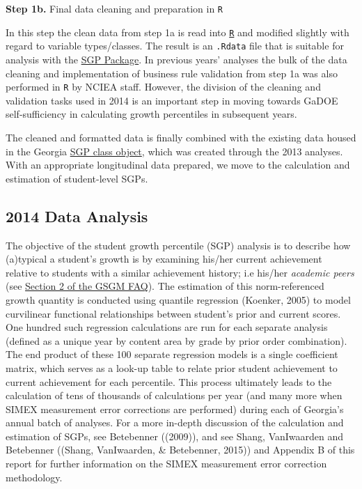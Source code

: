 \documentclass[12pt]{article}
\begin{document}
\textbf{Step 1b.} Final data cleaning and preparation in \texttt{R}

In this step the clean data from step 1a is read into
\href{http://www.r-project.org/}{\texttt{R}} and modified slightly with
regard to variable types/classes. The result is an \texttt{.Rdata} file
that is suitable for analysis with the
\href{https://github.com/CenterForAssessment/SGP}{SGP Package}. In
previous years' analyses the bulk of the data cleaning and
implementation of business rule validation from step 1a was also
performed in \texttt{R} by NCIEA staff. However, the division of the
cleaning and validation tasks used in 2014 is an important step in
moving towards GaDOE self-sufficiency in calculating growth percentiles
in subsequent years.

The cleaned and formatted data is finally combined with the existing
data housed in the Georgia
\href{http://cran.r-project.org/web/packages/SGP/SGP.pdf}{SGP class
object}, which was created through the 2013 analyses. With an
appropriate longitudinal data prepared, we move to the calculation and
estimation of student-level SGPs.

\subsection{2014 Data Analysis}\label{data-analysis}

The objective of the student growth percentile (SGP) analysis is to
describe how (a)typical a student's growth is by examining his/her
current achievement relative to students with a similar achievement
history; i.e his/her \emph{academic peers} (see
\href{https://docs.google.com/viewer?url=http\%3A\%2F\%2Fwww.gadoe.org\%2FCurriculum-Instruction-and-Assessment\%2FAssessment\%2FDocuments\%2FSGP\%2520FAQ\%2520072214.pdf}{Section
2 of the GSGM FAQ}). The estimation of this norm-referenced growth
quantity is conducted using quantile regression (Koenker, 2005) to model
curvilinear functional relationships between student's prior and current
scores. One hundred such regression calculations are run for each
separate analysis (defined as a unique year by content area by grade by
prior order combination). The end product of these 100 separate
regression models is a single coefficient matrix, which serves as a
look-up table to relate prior student achievement to current achievement
for each percentile. This process ultimately leads to the calculation of
tens of thousands of calculations per year (and many more when SIMEX
measurement error corrections are performed) during each of Georgia's
annual batch of analyses. For a more in-depth discussion of the
calculation and estimation of SGPs, see Betebenner ((2009)), and see
Shang, VanIwaarden and Betebenner ((Shang, VanIwaarden, \& Betebenner,
2015)) and Appendix B of this report for further information on the
SIMEX measurement error correction methodology.
\end{document}
